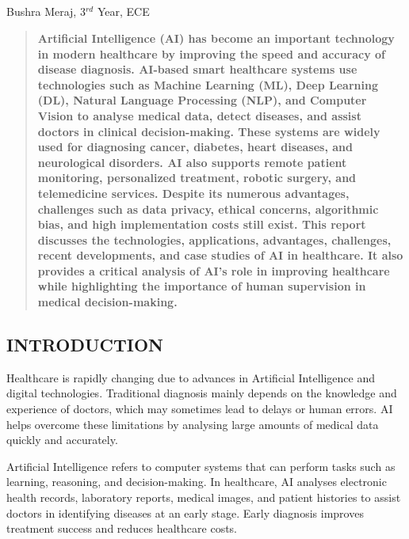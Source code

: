 \begin{center}
  \section{}
  Bushra Meraj, 3$^{rd}$ Year, ECE
\end{center}

\setcounter{figure}{0}

\begin{multicols}{2}
  \begin{abstract}
    \bfseries
    Artificial Intelligence (AI) has become an important technology in modern healthcare by improving the speed and accuracy of disease diagnosis. AI-based smart healthcare systems use technologies such as Machine Learning (ML), Deep Learning (DL), Natural Language Processing (NLP), and Computer Vision to analyse medical data, detect diseases, and assist doctors in clinical decision-making. These systems are widely used for diagnosing cancer, diabetes, heart diseases, and neurological disorders. AI also supports remote patient monitoring, personalized treatment, robotic surgery, and telemedicine services. Despite its numerous advantages, challenges such as data privacy, ethical concerns, algorithmic bias, and high implementation costs still exist. This report discusses the technologies, applications, advantages, challenges, recent developments, and case studies of AI in healthcare. It also provides a critical analysis of AI's role in improving healthcare while highlighting the importance of human supervision in medical decision-making.
  \end{abstract}
  \subsection*{\centering\uppercase{INTRODUCTION}}
  Healthcare is rapidly changing due to advances in Artificial Intelligence and digital technologies. Traditional diagnosis mainly depends on the knowledge and experience of doctors, which may sometimes lead to delays or human errors. AI helps overcome these limitations by analysing large amounts of medical data quickly and accurately.

  \noindent
  Artificial Intelligence refers to computer systems that can perform tasks such as learning, reasoning, and decision-making. In healthcare, AI analyses electronic health records, laboratory reports, medical images, and patient histories to assist doctors in identifying diseases at an early stage. Early diagnosis improves treatment success and reduces healthcare costs.


\end{multicols}
